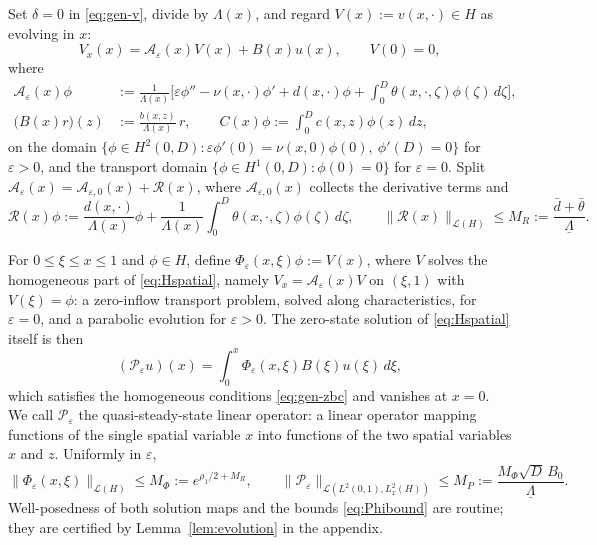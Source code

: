 \documentclass[12pt]{article}
\theoremstyle{plain}
\theoremstyle{remark}
\newcommand{\uL}{\underline\Lambda}
\newcommand{\PP}{\mathcal P}
\newcommand{\Hs}{H}
\begin{document}
Set $\delta=0$ in \eqref{eq:gen-v}, divide by $\Lambda(x)$, and regard $V(x):=v(x,\cdot)\in\Hs$ as evolving in $x$:
\begin{equation}
 V_x(x)=\mathcal A_\varepsilon(x)V(x)+B(x)u(x),\qquad V(0)=0,
 \label{eq:Hspatial}
\end{equation}
where
\begin{align}
 \mathcal A_\varepsilon(x)\phi
 &:=\frac{1}{\Lambda(x)}
 \Big[\varepsilon\phi''-\nu(x,\cdot)\phi'+d(x,\cdot)\phi
 +\int_0^D\theta(x,\cdot,\zeta)\phi(\zeta)\,d\zeta\Big],
 \label{eq:Aeps}\\
 \big(B(x)r\big)(z)&:=\frac{b(x,z)}{\Lambda(x)}\,r,
 \qquad
 C(x)\phi:=\int_0^D c(x,z)\phi(z)\,dz,
 \label{eq:BCgen}
\end{align}
on the domain $\{\phi\in H^2(0,D):\varepsilon\phi'(0)=\nu(x,0)\phi(0),\ \phi'(D)=0\}$ for $\varepsilon>0$, and the transport domain $\{\phi\in H^1(0,D):\phi(0)=0\}$ for $\varepsilon=0$. Split $\mathcal A_\varepsilon(x)=\mathcal A_{\varepsilon,0}(x)+\mathcal R(x)$, where $\mathcal A_{\varepsilon,0}(x)$ collects the derivative terms and
\begin{equation}
 \mathcal R(x)\phi
 :=\frac{d(x,\cdot)}{\Lambda(x)}\phi
 +\frac{1}{\Lambda(x)}\int_0^D\theta(x,\cdot,\zeta)\phi(\zeta)\,d\zeta,
 \qquad
 \|\mathcal R(x)\|_{\mathcal L(\Hs)}\le M_R:=\frac{\bar d+\bar\theta}{\uL}.
 \label{eq:Rdef}
\end{equation}

For $0\le\xi\le x\le1$ and $\phi\in\Hs$, define $\Phi_\varepsilon(x,\xi)\phi:=V(x)$, where $V$ solves the homogeneous part of \eqref{eq:Hspatial}, namely $V_x=\mathcal A_\varepsilon(x)V$ on $(\xi,1)$ with $V(\xi)=\phi$: a zero-inflow transport problem, solved along characteristics, for $\varepsilon=0$, and a parabolic evolution for $\varepsilon>0$. The zero-state solution of \eqref{eq:Hspatial} itself is then
\begin{equation}
 (\PP_\varepsilon u)(x)=\int_0^x\Phi_\varepsilon(x,\xi)B(\xi)u(\xi)\,d\xi ,
 \label{eq:Pgen}
\end{equation}
which satisfies the homogeneous conditions \eqref{eq:gen-zbc} and vanishes at $x=0$. We call $\PP_\varepsilon$ the quasi-steady-state linear operator: a linear operator mapping functions of the single spatial variable $x$ into functions of the two spatial variables $x$ and $z$. Uniformly in $\varepsilon$,
\begin{equation}
 \|\Phi_\varepsilon(x,\xi)\|_{\mathcal L(\Hs)}\le M_\Phi:=e^{\rho_1/2+M_R},
 \qquad
 \|\PP_\varepsilon\|_{\mathcal L(L^2(0,1),L^2_x(\Hs))}\le M_P:=\frac{M_\Phi\sqrt D\,B_0}{\uL} .
 \label{eq:Phibound}
\end{equation}
Well-posedness of both solution maps and the bounds \eqref{eq:Phibound} are routine; they are certified by Lemma~\ref{lem:evolution} in the appendix.
\end{document}
